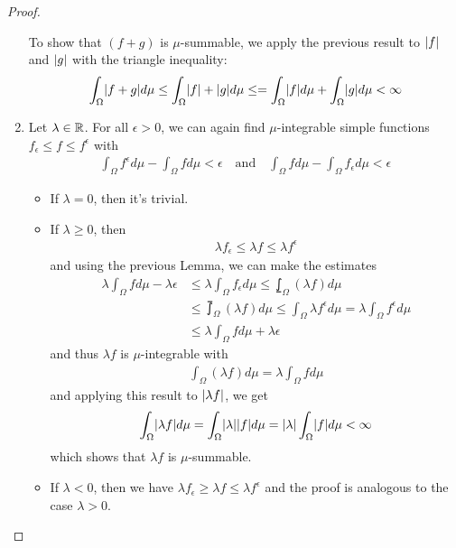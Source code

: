 \begin{proof}
\begin{enumerate}
  To show that $(f+g)$ is $\mu$-summable, we apply the previous result to $\vert f\vert$ and $\vert g\vert$ with the triangle inequality:
  \begin{align*}
    \int_{\Omega} \abs{f+g} d \mu
    \leq
    \int_{\Omega} \abs{f} + \abs{g} d \mu
    \leq
    = \int_{\Omega} \abs{f} d \mu
    + \int_{\Omega} \abs{g} d \mu
    < \infty
  \end{align*}

\item Let $\lambda \in \mathbb{R}$. For all $\epsilon > 0$, we can again find $\mu$-integrable simple functions $f_{\epsilon} \leq f \leq f^{\epsilon}$ with
  \begin{align*}
    \int_{\Omega} f^{\epsilon} d \mu - \int_{\Omega} f d \mu < \epsilon \quad \text{and} \quad
    \int_{\Omega} f d \mu - \int_{\Omega} f_{\epsilon} d \mu < \epsilon
  \end{align*}
  \begin{itemize}
    \item If $\lambda = 0$, then it's trivial.

    \item If $\lambda \geq 0$, then
      \begin{align*}
        \lambda f_{\epsilon} \leq \lambda f \leq \lambda f^{\epsilon}
      \end{align*}
      and using the previous Lemma, we can make the estimates
      \begin{align*}
        \lambda \int_{\Omega} f d \mu - \lambda \epsilon 
        &\leq 
        \lambda \int_{\Omega} f_{\epsilon} d \mu 
        \leq 
        \lowint_{\Omega} (\lambda f) d \mu\\
        &\leq 
        \upint_{\Omega} (\lambda f) d \mu
        \leq 
        \int_{\Omega} \lambda f^{\epsilon} d \mu
        =
        \lambda \int_{\Omega} f^{\epsilon} d \mu
        \\
        &\leq
        \lambda \int_{\Omega} f d \mu + \lambda \epsilon
      \end{align*}
      and thus $\lambda f$ is $\mu$-integrable with
      \begin{align*}
        \int_{\Omega} (\lambda f) d \mu = \lambda \int_{\Omega} f d \mu
      \end{align*}
      and applying this result to $\vert\lambda f\vert$, we get
      \begin{align*}
        \int_{\Omega} \abs{\lambda f} d \mu = \int_{\Omega} \abs{\lambda} \abs{f} d \mu = \abs{\lambda} \int_{\Omega} \abs{f} d \mu < \infty
      \end{align*}
      which shows that $\lambda f$ is $\mu$-summable.
    \item If $\lambda < 0$, then we have
      $
        \lambda f_{\epsilon} \geq \lambda f \leq \lambda f^{\epsilon} 
      $
      and the proof is analogous to the case $\lambda > 0$.
  \end{itemize}
\end{enumerate}
\end{proof}


